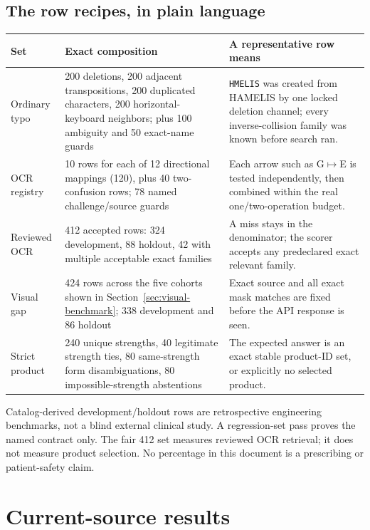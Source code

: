 \documentclass[10pt,a4paper]{article}
\newcommand{\observed}[1]{\texttt{#1}}
\begin{document}
\subsection{The row recipes, in plain language}

\begin{tabularx}{\textwidth}{@{}L{35mm}Y Y@{}}
\toprule
Set & Exact composition & A representative row means \\
\midrule
Ordinary typo & 200 deletions, 200 adjacent transpositions, 200 duplicated characters, 200 horizontal-keyboard neighbors; plus 100 ambiguity and 50 exact-name guards & \observed{HMELIS} was created from HAMELIS by one locked deletion channel; every inverse-collision family was known before search ran. \\
OCR registry & 10 rows for each of 12 directional mappings (120), plus 40 two-confusion rows; 78 named challenge/source guards & Each arrow such as G$\mapsto$E is tested independently, then combined within the real one/two-operation budget. \\
Reviewed OCR & 412 accepted rows: 324 development, 88 holdout, 42 with multiple acceptable exact families & A miss stays in the denominator; the scorer accepts any predeclared exact relevant family. \\
Visual gap & 424 rows across the five cohorts shown in Section~\ref{sec:visual-benchmark}; 338 development and 86 holdout & Exact source and all exact mask matches are fixed before the API response is seen. \\
Strict product & 240 unique strengths, 40 legitimate strength ties, 80 same-strength form disambiguations, 80 impossible-strength abstentions & The expected answer is an exact stable product-ID set, or explicitly no selected product. \\
\bottomrule
\end{tabularx}

\begin{safetybox}[title=What these datasets do not prove]
Catalog-derived development/holdout rows are retrospective engineering
benchmarks, not a blind external clinical study. A regression-set pass proves
the named contract only. The fair 412 set measures reviewed OCR retrieval; it
does not measure product selection. No percentage in this document is a
prescribing or patient-safety claim.
\end{safetybox}

\section{Current-source results}
\end{document}
